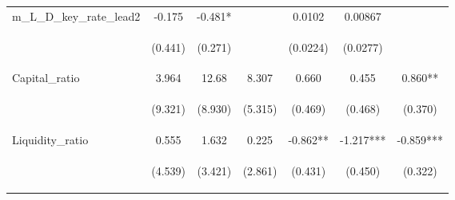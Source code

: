 \documentclass[]{article}
\begin{document}
\begin{center}
\begin{tabular}{lcccccc}
m\_L\_D\_key\_rate\_lead2 & -0.175 & -0.481* &  & 0.0102 & 0.00867 &  \\
\vspace{4pt} & \begin{footnotesize}(0.441)\end{footnotesize} & \begin{footnotesize}(0.271)\end{footnotesize} & \begin{footnotesize}\end{footnotesize} & \begin{footnotesize}(0.0224)\end{footnotesize} & \begin{footnotesize}(0.0277)\end{footnotesize} & \begin{footnotesize}\end{footnotesize} \\
Capital\_ratio & 3.964 & 12.68 & 8.307 & 0.660 & 0.455 & 0.860** \\
\vspace{4pt} & \begin{footnotesize}(9.321)\end{footnotesize} & \begin{footnotesize}(8.930)\end{footnotesize} & \begin{footnotesize}(5.315)\end{footnotesize} & \begin{footnotesize}(0.469)\end{footnotesize} & \begin{footnotesize}(0.468)\end{footnotesize} & \begin{footnotesize}(0.370)\end{footnotesize} \\
Liquidity\_ratio & 0.555 & 1.632 & 0.225 & -0.862** & -1.217*** & -0.859*** \\
\vspace{4pt} & \begin{footnotesize}(4.539)\end{footnotesize} & \begin{footnotesize}(3.421)\end{footnotesize} & \begin{footnotesize}(2.861)\end{footnotesize} & \begin{footnotesize}(0.431)\end{footnotesize} & \begin{footnotesize}(0.450)\end{footnotesize} & \begin{footnotesize}(0.322)\end{footnotesize} \\

\end{tabular}
\end{center}
\end{document}
